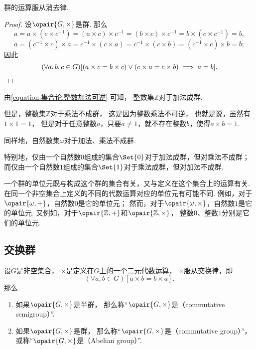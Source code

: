 \begin{theorem}\label{theorem:抽象代数.群的运算服从消去律}
群的运算服从消去律.
\begin{proof}
设\(\opair{G,\times}\)是群.
那么\begin{equation*}
	a=a\times(c\times c^{-1})
	=(a\times c)\times c^{-1}=(b\times c)\times c^{-1}
	=b\times(c\times c^{-1})
	=b,
\end{equation*}\begin{equation*}
	a=(c^{-1}\times c)\times a
	= c^{-1}\times(c\times a)
	= c^{-1}\times(c\times b)
	= (c^{-1}\times c)\times b
	= b;
\end{equation*}
因此\begin{equation*}
	(\forall a,b,c\in G)[
		(a\times c=b\times c)\lor(c\times a=c\times b) \implies a=b
	].
	\qedhere
\end{equation*}
\end{proof}
\end{theorem}

由\cref{equation:集合论.整数加法可逆} 可知，
整数集\(\mathbb{Z}\)对于加法成群.

但是，整数集\(\mathbb{Z}\)对于乘法不成群，
这是因为整数乘法不可逆，
也就是说，虽然有\(1\times1=1\)，
但是对于任意整数\(a\)，只要\(a\neq1\)，就不存在整数\(b\)，使得\(a \times b = 1\).

同样地，自然数集\(\omega\)对于加法、乘法不成群.

特别地，仅由一个自然数\(0\)组成的集合\(\Set{0}\)对于加法成群，但对乘法不成群；
而仅由一个自然数\(1\)组成的集合\(\Set{1}\)对于乘法成群，但对加法不成群.

一个群的单位元既与构成这个群的集合有关，又与定义在这个集合上的运算有关.
在同一个非空集合上定义的不同的代数运算对应的单位元有可能不同.
例如，对于\(\opair{\omega,+}\)，自然数\(0\)是它的单位元；
然而，对于\(\opair{\omega,\times}\)，自然数\(1\)是它的单位元.
又例如，对于\(\opair{\mathbb{Z},+}\)和\(\opair{\mathbb{Z},\times}\)，
整数\(0\)、整数\(1\)分别是它们的单位元.

\subsection{交换群}
\begin{definition}\label{definition:抽象代数.交换群的定义}
设\(G\)是非空集合，
\(\times\)是定义在\(G\)上的一个二元代数运算，
\(\times\)服从交换律，即\begin{equation*}
	(\forall a,b \in G)[a \times b = b \times a].
\end{equation*}
那么\begin{enumerate}
	\item 如果\(\opair{G,\times}\)是半群，
	那么称“\(\opair{G,\times}\)是（commutative semigroup）”.
	\item 如果\(\opair{G,\times}\)是群，
	那么称“\(\opair{G,\times}\)是（commutative group）”，
	或称“\(\opair{G,\times}\)是（Abelian group）”.
\end{enumerate}
\end{definition}

